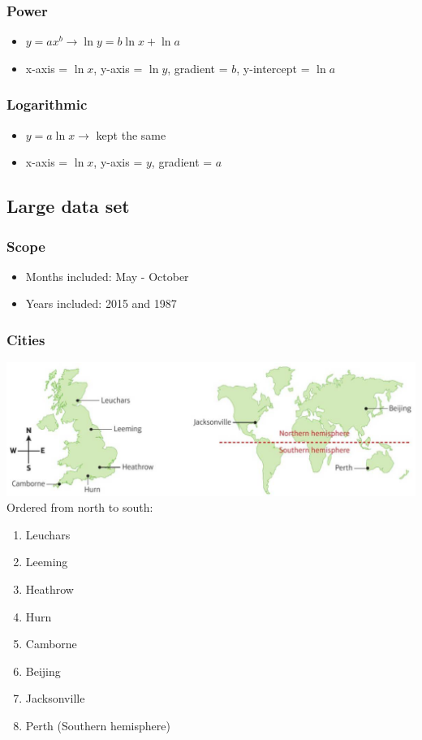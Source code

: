 \documentclass[A4paper]{article}
\begin{document}
	\subsubsection{Power}
	\begin{itemize}
		\item $y=ax^b\rightarrow\ln y = b\ln x + \ln a$
		\item x-axis = $\ln x$, y-axis = $\ln y$, gradient = $b$, y-intercept = $\ln a$
	\end{itemize}
	
	\subsubsection{Logarithmic}
	\begin{itemize}
		\item $y=a\ln x\rightarrow$ kept the same
		\item x-axis = $\ln x$, y-axis = $y$, gradient = $a$
	\end{itemize}
	
	
	\subsection{Large data set}
	\subsubsection{Scope}
	\begin{itemize}
		\item Months included: May - October
		\item Years included: 2015 and 1987
	\end{itemize}
	\subsubsection{Cities}
	\includegraphics{LDSmap}\\
	Ordered from north to south:
	\begin{enumerate}
		\item Leuchars
		\item Leeming
		\item Heathrow
		\item Hurn
		\item Camborne
		\item Beijing
		\item Jacksonville
		\item Perth (Southern hemisphere)
	\end{enumerate}
	
\end{document}
